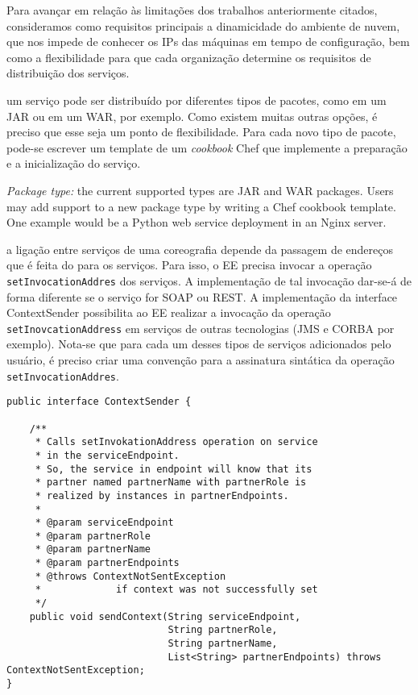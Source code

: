 \begin{description}
Para avançar em relação às limitações dos trabalhos anteriormente citados,  consideramos como requisitos principais a dinamicidade do ambiente de nuvem, que nos impede de conhecer os IPs das máquinas em tempo de configuração, bem como a flexibilidade para que cada organização determine os requisitos de distribuição dos serviços.

\item [Tipos de pacotes de serviços:] um serviço pode ser distribuído por diferentes tipos de pacotes, como em um JAR ou em um WAR, por exemplo. Como existem muitas outras opções, é preciso que esse seja um ponto de flexibilidade. Para cada novo tipo de pacote, pode-se escrever um template de um \emph{cookbook} Chef que implemente a preparação e a inicialização do serviço. 

\item \emph{Package type:} the current supported types
are JAR and WAR packages. Users may add support to a new package type
by writing a Chef cookbook template.
One example would be a Python web service deployment in an Nginx server.

\item [Tipos de serviços:] a ligação entre serviços de uma coreografia depende da passagem de endereços que é feita do \ee para os serviços. Para isso, o EE precisa invocar a operação \texttt{setInvocationAddres} dos serviços. A implementação de tal invocação dar-se-á de forma diferente se o serviço for SOAP ou REST. A implementação da interface \textsf{ContextSender} possibilita ao EE realizar a invocação da operação \texttt{setInovcationAddress} em serviços de outras tecnologias (JMS e CORBA por exemplo). Nota-se que para cada um desses tipos de serviços adicionados pelo usuário, é preciso criar uma convenção para a assinatura sintática da operação \texttt{setInvocationAddres}.

\begin{lstlisting}[frame=trbl, label=lst:context_sender, caption=Interface ContextSender.]
public interface ContextSender {

    /**
     * Calls setInvokationAddress operation on service 
     * in the serviceEndpoint.
     * So, the service in endpoint will know that its 
     * partner named partnerName with partnerRole is 
     * realized by instances in partnerEndpoints.
     * 
     * @param serviceEndpoint
     * @param partnerRole
     * @param partnerName
     * @param partnerEndpoints
     * @throws ContextNotSentException
     *             if context was not successfully set
     */
    public void sendContext(String serviceEndpoint, 
                            String partnerRole, 
                            String partnerName, 
                            List<String> partnerEndpoints) throws ContextNotSentException;
}
\end{lstlisting}

\end{description}


